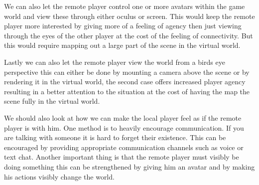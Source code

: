 		We can also let the remote player control one or more avatars within the game world
		and view these through either oculus or screen. This would keep the remote player
		more interested by giving more of a feeling of agency then just viewing through the eyes 
		of the other player at the cost of the feeling of connectivity. But this would require 
		mapping out a large part of the scene in the virtual world. 
		
		Lastly we can also let the remote player view the world from a birds eye perspective 
		this can either be done by mounting a camera above the scene or by rendering it in 
		the virtual world, the second case offers increased player agency resulting in 
		a better attention to the situation at the cost of having the map the scene fully 
		in the virtual world. 
		
		We should also look at how we can make the local player feel as if the remote 
		player is with him. One method is to heavily encourage communication. If you 
		are talking with someone it is hard to forget their existence. This can be 
		encouraged by providing appropriate communication channels such as voice or text 
		chat. Another important thing is that the remote player must visibly be doing something
		this can be strengthened by giving him an avatar and by making his actions visibly 
		change the world. 

